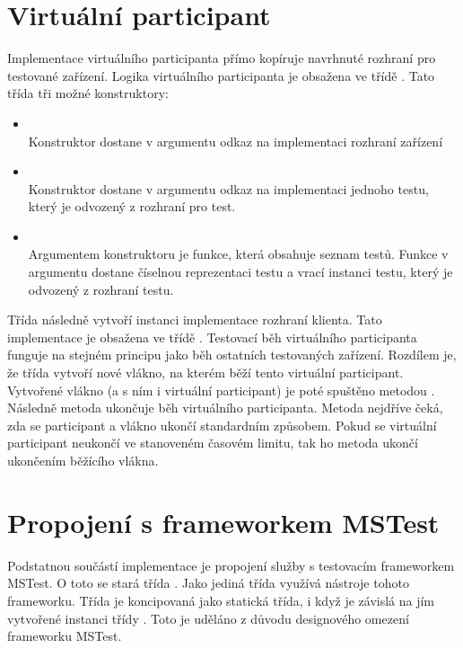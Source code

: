 

\section{Virtuální participant}
Implementace virtuálního participanta přímo kopíruje navrhnuté rozhraní pro testované zařízení. Logika virtuálního participanta je obsažena ve třídě . Tato třída tři možné konstruktory:

\begin{itemize} 
    \item {} \\
    Konstruktor dostane v argumentu odkaz na implementaci rozhraní zařízení
    \item {} \\
    Konstruktor dostane v argumentu odkaz na implementaci jednoho testu, který je odvozený z rozhraní pro test.
    \item {} \\
    Argumentem konstruktoru je funkce, která obsahuje seznam testů. Funkce v argumentu dostane číselnou reprezentaci testu a vrací instanci testu, který je odvozený z rozhraní testu.
\end{itemize}

Třída následně vytvoří instanci implementace rozhraní klienta. Tato implementace je obsažena ve třídě . Testovací běh virtuálního participanta funguje na stejném principu jako běh ostatních testovaných zařízení. Rozdílem je, že třída  vytvoří nové vlákno, na kterém běží tento virtuální participant. Vytvořené vlákno (a s ním i virtuální participant) je poté spuštěno metodou . Následně metoda  ukončuje běh virtuálního participanta. Metoda nejdříve čeká, zda se participant a vlákno ukončí standardním způsobem. Pokud se virtuální participant neukončí ve stanoveném časovém limitu, tak ho metoda ukončí ukončením běžícího vlákna.


\section{Propojení s frameworkem MSTest}

Podstatnou součástí implementace je propojení služby s testovacím frameworkem MSTest. O toto se stará třída . Jako jediná třída využívá nástroje tohoto frameworku. Třída je koncipovaná jako statická třída, i když je závislá na jím vytvořené instanci třídy . Toto je uděláno z důvodu designového omezení frameworku MSTest. 

